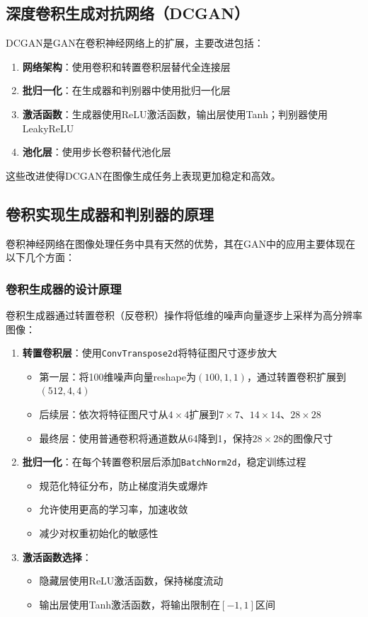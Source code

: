 \documentclass[UTF8]{ctexart}
\begin{document}
\subsection{深度卷积生成对抗网络（DCGAN）}

DCGAN是GAN在卷积神经网络上的扩展，主要改进包括：

\begin{enumerate}
\item \textbf{网络架构}：使用卷积和转置卷积层替代全连接层
\item \textbf{批归一化}：在生成器和判别器中使用批归一化层
\item \textbf{激活函数}：生成器使用ReLU激活函数，输出层使用Tanh；判别器使用LeakyReLU
\item \textbf{池化层}：使用步长卷积替代池化层
\end{enumerate}

这些改进使得DCGAN在图像生成任务上表现更加稳定和高效。

\subsection{卷积实现生成器和判别器的原理}

卷积神经网络在图像处理任务中具有天然的优势，其在GAN中的应用主要体现在以下几个方面：

\subsubsection{卷积生成器的设计原理}

卷积生成器通过转置卷积（反卷积）操作将低维的噪声向量逐步上采样为高分辨率图像：

\begin{enumerate}
\item \textbf{转置卷积层}：使用\texttt{ConvTranspose2d}将特征图尺寸逐步放大
\begin{itemize}
\item 第一层：将100维噪声向量reshape为$(100, 1, 1)$，通过转置卷积扩展到$(512, 4, 4)$
\item 后续层：依次将特征图尺寸从$4 \times 4$扩展到$7 \times 7$、$14 \times 14$、$28 \times 28$
\item 最终层：使用普通卷积将通道数从64降到1，保持$28 \times 28$的图像尺寸
\end{itemize}

\item \textbf{批归一化}：在每个转置卷积层后添加\texttt{BatchNorm2d}，稳定训练过程
\begin{itemize}
\item 规范化特征分布，防止梯度消失或爆炸
\item 允许使用更高的学习率，加速收敛
\item 减少对权重初始化的敏感性
\end{itemize}

\item \textbf{激活函数选择}：
\begin{itemize}
\item 隐藏层使用ReLU激活函数，保持梯度流动
\item 输出层使用Tanh激活函数，将输出限制在$[-1, 1]$区间
\end{itemize}
\end{enumerate}
\end{document}
